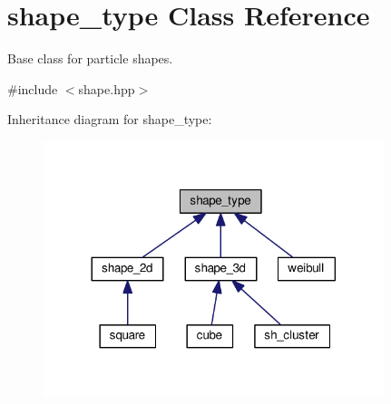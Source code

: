 \hypertarget{classshape__type}{}\section{shape\+\_\+type Class Reference}
\label{classshape__type}


Base class for particle shapes.  




{\ttfamily \#include $<$shape.\+hpp$>$}



Inheritance diagram for shape\+\_\+type\+:
\nopagebreak
\begin{figure}[H]
\begin{center}
\leavevmode
\includegraphics[width=281pt]{d2/da8/classshape__type__inherit__graph}
\end{center}
\end{figure}
